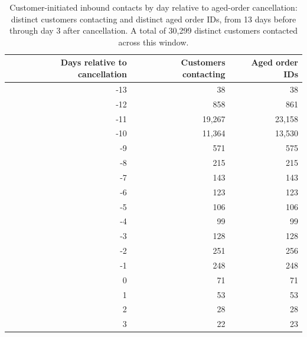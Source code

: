 \begin{table}[!htbp]
\centering
\caption{Customer-initiated inbound contacts by day relative to aged-order cancellation: distinct customers contacting and distinct aged order IDs, from 13 days before through day 3 after cancellation. A total of 30,299 distinct customers contacted across this window.}
\label{tab:aged-customer-contacts-by-cancellation-day}
\begin{tabular}{@{}rrr@{}}
\toprule
Days relative to cancellation & Customers contacting & Aged order IDs \\
\midrule

-13 & 38 & 38 \\

-12 & 858 & 861 \\

-11 & 19,267 & 23,158 \\

-10 & 11,364 & 13,530 \\

-9 & 571 & 575 \\

-8 & 215 & 215 \\

-7 & 143 & 143 \\

-6 & 123 & 123 \\

-5 & 106 & 106 \\

-4 & 99 & 99 \\

-3 & 128 & 128 \\

-2 & 251 & 256 \\

-1 & 248 & 248 \\

0 & 71 & 71 \\

1 & 53 & 53 \\

2 & 28 & 28 \\

3 & 22 & 23 \\
\bottomrule
\end{tabular}


\end{table}
